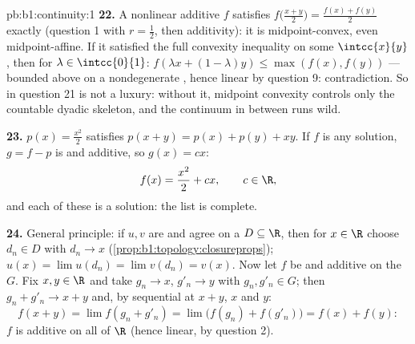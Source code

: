 \begin{solution}{pb:b1:continuity:1}
\textbf{22.} A nonlinear additive $f$ satisfies
$f\bigl(\frac{x+y}{2}\bigr) = \frac{f(x) + f(y)}{2}$ exactly
(question 1 with $r = \frac12$, then additivity): it is
midpoint-convex, even midpoint-affine. If it satisfied the full
convexity inequality on some  $\intcc{x}{y}$, then for
$\lambda \in \intcc{0}{1}$: $f(\lambda x + (1-\lambda)y) \leq
\max(f(x), f(y))$ --- bounded above on a nondegenerate ,
hence linear by question 9: contradiction. So  in
question 21 is not a luxury: without it, midpoint convexity
controls only the countable dyadic skeleton, and the continuum
in between runs wild.

\textbf{23.} $p(x) = \frac{x^2}{2}$ satisfies $p(x+y) = p(x) +
p(y) + xy$. If $f$ is any  solution, $g = f - p$ is
 and additive, so $g(x) = cx$:
\[
f(x) = \frac{x^2}{2} + cx , \qquad c \in \R ,
\]
and each of these is a solution: the list is complete.

\textbf{24.} General principle: if $u, v$ are  and
agree on a  $D \subseteq \R$, then for $x \in \R$ choose
$d_n \in D$ with $d_n \to x$
(\cref{prop:b1:topology:closureprops}); $u(x) = \lim u(d_n) =
\lim v(d_n) = v(x)$. Now let $f$ be  and additive on
the   $G$. Fix $x, y \in \R$ and take $g_n \to x$,
$g'_n \to y$ with $g_n, g'_n \in G$; then $g_n + g'_n \to x + y$
and, by sequential  at $x + y$, $x$ and $y$:
\[
f(x + y) = \lim f(g_n + g'_n) = \lim\bigl(f(g_n) +
f(g'_n)\bigr) = f(x) + f(y) :
\]
$f$ is additive on all of $\R$ (hence linear, by question 2).


\end{solution}
